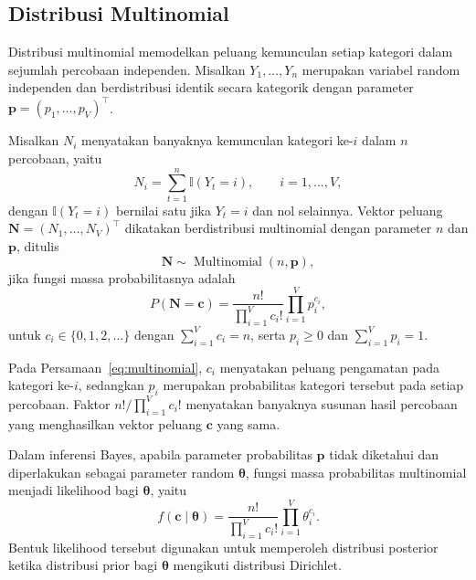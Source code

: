 \subsection{Distribusi Multinomial}
\label{subsec:distribusimultinomial}

Distribusi multinomial memodelkan peluang kemunculan setiap kategori dalam sejumlah percobaan
independen. Misalkan $Y_1,\ldots,Y_n$ merupakan variabel random
independen dan berdistribusi identik secara kategorik dengan parameter
$\bm{p}=(p_1,\ldots,p_V)^\top$.

\begin{definisi}
\label{def:multinomial}
Misalkan $N_i$ menyatakan banyaknya kemunculan kategori ke-$i$ dalam
$n$ percobaan, yaitu
\begin{equation}
N_i=\sum_{t=1}^{n}\mathbb{I}(Y_t=i),
\qquad i=1,\ldots,V,
\end{equation}
dengan $\mathbb{I}(Y_t=i)$ bernilai satu jika $Y_t=i$ dan nol
selainnya. Vektor peluang
$\bm{N}=(N_1,\ldots,N_V)^\top$ dikatakan berdistribusi multinomial
dengan parameter $n$ dan $\bm{p}$, ditulis
\[
\bm{N}\sim\operatorname{Multinomial}(n,\bm{p}),
\]
jika fungsi massa probabilitasnya adalah
\begin{equation}
P(\bm{N}=\bm{c})
=
\frac{n!}{\prod_{i=1}^{V}c_i!}
\prod_{i=1}^{V}p_i^{c_i},
\label{eq:multinomial}
\end{equation}
untuk $c_i\in\{0,1,2,\ldots\}$ dengan
$\sum_{i=1}^{V}c_i=n$, serta $p_i\geq 0$ dan
$\sum_{i=1}^{V}p_i=1$.
\end{definisi}

Pada Persamaan~\eqref{eq:multinomial}, $c_i$ menyatakan peluang
pengamatan pada kategori ke-$i$, sedangkan $p_i$ merupakan probabilitas
kategori tersebut pada setiap percobaan. Faktor
$n!/\prod_{i=1}^{V}c_i!$ menyatakan banyaknya susunan hasil percobaan
yang menghasilkan vektor peluang $\bm{c}$ yang sama.

Dalam inferensi Bayes, apabila parameter probabilitas $\bm{p}$ tidak
diketahui dan diperlakukan sebagai parameter random $\bm{\theta}$,
fungsi massa probabilitas multinomial menjadi likelihood bagi
$\bm{\theta}$, yaitu
\begin{equation}
f(\bm{c}\mid\bm{\theta})
=
\frac{n!}{\prod_{i=1}^{V}c_i!}
\prod_{i=1}^{V}\theta_i^{c_i}.
\label{eq:likelihoodmultinomial}
\end{equation}
Bentuk likelihood tersebut digunakan untuk memperoleh distribusi
posterior ketika distribusi prior bagi $\bm{\theta}$ mengikuti
distribusi Dirichlet.

